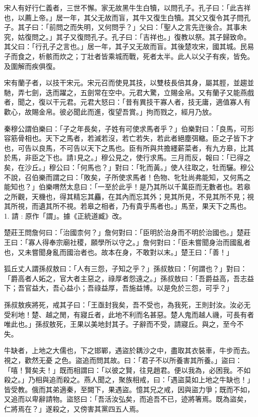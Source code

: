 \begin{pinyinscope}
宋人有好行仁義者，三世不懈。家无故黑牛生白犢，以問孔子。孔子曰：「此吉祥也，以薦上帝。」居一年，其父无故而盲，其牛又復生白犢。其父又復令其子問孔子。其子曰：「前問之而失明，又何問乎？」父曰：「聖人之言先迕後合。其事未究，姑復問之。」其子又復問孔子。孔子曰：「吉祥也。」復教以祭。其子歸致命。其父曰：「行孔子之言也。」居一年，其子又无故而盲。其後楚攻宋，國其城。民易子而食之，析骸而炊之；丁壯者皆乘城而戰，死者太半。此人以父子有疾，皆免。及圍解而疾俱復。

宋有蘭子者，以技干宋元。宋元召而使見其技，以雙枝長倍其身，屬其脛，並趨並馳，弄七劍，迭而躍之，五劍常在空中。元君大驚，立賜金帛。又有蘭子又能燕戲者，聞之，復以干元君。元君大怒曰：「昔有異技干寡人者，技无庸，適值寡人有歡心，故賜金帛。彼必聞此而進，復望吾賞。」拘而戮之，經月乃放。

秦穆公謂伯樂曰：「子之年長矣，子姓有可使求馬者乎？」伯樂對曰：「良馬，可形容筋骨相也。天下之馬者，若滅若沒，若亡若失，若此者絕塵弭轍。臣之子皆下才也，可告以良馬，不可告以天下之馬也。臣有所與共擔纆薪菜者，有九方皋，比其於馬，非臣之下也。請1見之。」穆公見之，使行求馬。三月而反，報曰：「已得之矣，在沙丘。」穆公曰：「何馬也？」對曰：「牝而黃。」使人往取之，牡而驪。穆公不說，召伯樂而謂之曰：「敗矣，子所使求馬者！色物、牝牡尚弗能知，又何馬之能知也？」伯樂喟然太息曰：「一至於此乎！是乃其所以千萬臣而无數者也。若皋之所觀，天機也，得其精忘其麤，在其內而忘其外；見其所見，不見其所不見；視其所視，而遺其所不視。若皋之相者，乃有貴乎馬者也。」馬至，果天下之馬也。1. 請 : 原作「謂」。據《正統道臧》改。

楚莊王問詹何曰：「治國柰何？」詹何對曰：「臣明於治身而不明於治國也。」楚莊王曰：「寡人得奉宗廟社稷，願學所以守之。」詹何對曰：「臣未嘗聞身治而國亂者也，又未嘗聞身亂而國治者也。故本在身，不敢對以末。」楚王曰：「善！」

狐丘丈人謂孫叔敖曰：「人有三怨，子知之乎？」孫叔敖曰：「何謂也？」對曰：「爵高者人妬之，官大者主惡之，祿厚者怨遠之。」孫叔敖曰：「吾爵益高，吾志益下；吾官益大，吾心益小；吾祿益厚，吾施益博。以是免於三怨，可乎？」

孫叔敖疾將死，戒其子曰：「王亟封我矣，吾不受也，為我死，王則封汝。汝必无受利地！楚、越之閒，有寢丘者，此地不利而名甚惡。楚人鬼而越人禨，可長有者唯此也。」孫叔敖死，王果以美地封其子。子辭而不受，請寢丘。與之，至今不失。

牛缺者，上地之大儒也，下之邯鄲，遇盜於耦沙之中，盡取其衣裝車，牛步而去。視之，歡然无憂𠫤之色。盜追而問其故。曰：「君子不以所養害其所養。」盜曰：「嘻！賢矣夫！」既而相謂曰：「以彼之賢，往見趙君。便以我為，必困我。不如殺之。」乃相與追而殺之。燕人聞之，聚族相戒，曰：「遇盜莫如上地之牛缺也！」皆受教。俄而其弟適秦，至闕下，果遇盜。憶其兄之戒，因與盜力爭；既而不如，又追而以卑辭請物。盜怒曰：「吾活汝弘矣，而追吾不已，迹將箸焉。既為盜矣，仁將焉在？」遂殺之，又傍害其黨四五人焉。


\end{pinyinscope}
